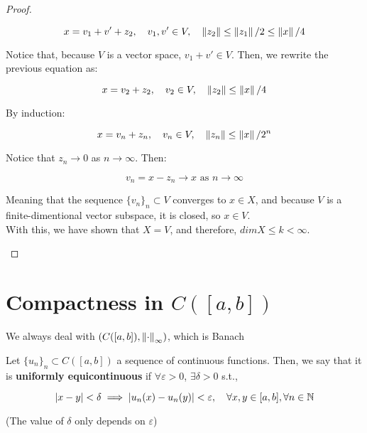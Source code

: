 \begin{proof}
\begin{itemize}
        $$x = v_1 + v' + z_2, \quad v_1, v' \in V, \quad \left\|z_2\right\| \leq \left\|z_1\right\|/2 \leq \left\|x\right\|/4$$

        Notice that, because $V$ is a vector space, $v_1 + v' \in V$. Then, we rewrite the previous equation as:

        $$x = v_2 + z_2, \quad v_2 \in V, \quad \left\|z_2\right\| \leq \left\|x\right\|/4$$

        By induction:

        $$x = v_n + z_n, \quad v_n \in V, \quad \left\|z_n\right\| \leq \left\|x\right\|/2^n$$

        Notice that $z_n \to 0$ as $n \to \infty$. Then:

        $$v_n = x - z_n \to x \text{ as } n \to \infty$$

        Meaning that the sequence $\{v_n\}_n \subset V$ converges to $x \in X$, and because
        $V$ is a finite-dimentional vector subspace, it is closed, so $x \in V$.\\

        With this, we have shown that $X = V$, and therefore, $dim X \leq k < \infty$.

    \end{itemize}
\end{proof}

\section{Compactness in $C([a, b])$}

\begin{note}
    We always deal with $(C([a, b]), \left\|\cdot\right\|_{\infty})$, which is Banach
\end{note}

\begin{fdefinition}
    Let $\{u_n\}_n \subset C([a, b])$ a sequence of continuous functions. 
    Then, we say that it is \textbf{uniformly equicontinuous} if $\forall \varepsilon > 0$,
    $\exists \delta > 0$ s.t.,

    $$|x - y| < \delta \implies |u_n(x) - u_n(y)| < \varepsilon, \quad \forall 
    x, y \in [a, b], \forall n \in \mathbb{N}$$

    (The value of $\delta$ only depends on $\varepsilon$)
\end{fdefinition}

\vspace{1em}

